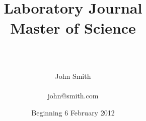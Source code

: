 \documentclass[a4paper,12pt]{article}
\begin{document}
\rhead{}
\lhead{}


\title{
\begin{center}
\HRule \\[0.4cm]
{\Huge \bfseries Laboratory Journal \\[0.5cm] \Large Master of Science}\\[0.4cm] %
\HRule \\[1.5cm]
\end{center}
}
\author{\Huge John Smith \\ \\ \LARGE john@smith.com \\[2cm]} %
\date{Beginning 6 February 2012} %
\maketitle
\end{document}
